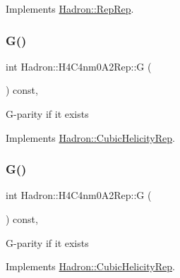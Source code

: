 Implements \mbox{\hyperlink{structHadron_1_1RepRep_a92c8802e5ed7afd7da43ccfd5b7cd92b}{Hadron\+::\+Rep\+Rep}}.

\mbox{\label{structHadron_1_1H4C4nm0A2Rep_a3e0953884b60350c510ec87f83956152}} 
\subsubsection{\texorpdfstring{G()}{G()}\hspace{0.1cm}{\footnotesize\ttfamily [1/3]}}
{\footnotesize\ttfamily int Hadron\+::\+H4\+C4nm0\+A2\+Rep\+::G (\begin{DoxyParamCaption}{ }\end{DoxyParamCaption}) const\hspace{0.3cm}{\ttfamily [inline]}, {\ttfamily [virtual]}}

G-\/parity if it exists 

Implements \mbox{\hyperlink{structHadron_1_1CubicHelicityRep_a50689f42be1e6170aa8cf6ad0597018b}{Hadron\+::\+Cubic\+Helicity\+Rep}}.

\mbox{\label{structHadron_1_1H4C4nm0A2Rep_a3e0953884b60350c510ec87f83956152}} 
\subsubsection{\texorpdfstring{G()}{G()}\hspace{0.1cm}{\footnotesize\ttfamily [2/3]}}
{\footnotesize\ttfamily int Hadron\+::\+H4\+C4nm0\+A2\+Rep\+::G (\begin{DoxyParamCaption}{ }\end{DoxyParamCaption}) const\hspace{0.3cm}{\ttfamily [inline]}, {\ttfamily [virtual]}}

G-\/parity if it exists 

Implements \mbox{\hyperlink{structHadron_1_1CubicHelicityRep_a50689f42be1e6170aa8cf6ad0597018b}{Hadron\+::\+Cubic\+Helicity\+Rep}}.

\mbox{\label{structHadron_1_1H4C4nm0A2Rep_a3e0953884b60350c510ec87f83956152}} 
